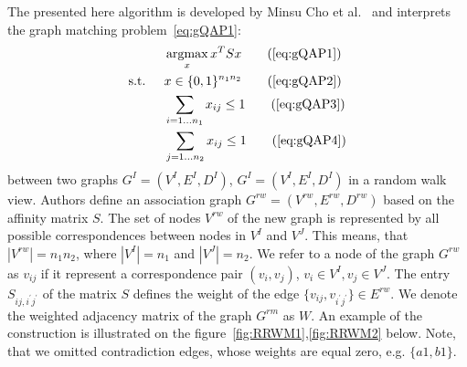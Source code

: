 The presented here algorithm is developed by Minsu Cho et al.~\cite{Cho2010_RRWM} and interprets the graph matching problem~\eqref{eq:gQAP1}:
\begin{alignat*}{2}
&     && \argmax_x{x^TSx}                           \tag{\ref{eq:gQAP1}}\\
& \text{s.t. } &&  x\in \{0,1\}^{n_1n_2}            \tag{\ref{eq:gQAP2}}\\
&             &&  \sum_{i=1\dots n_1} x_{ij}\le 1   \tag{\ref{eq:gQAP3}}\\
&             &&  \sum_{j=1\dots n_2} x_{ij}\le 1   \tag{\ref{eq:gQAP4}}
\end{alignat*}
between two graphs $G^I=(V^I,E^I,D^I)$, $G^I=(V^I,E^I,D^I)$ in a random walk view. Authors define an association graph $G^{rw}=(V^{rw},E^{rw},D^{rw})$ based on the affinity matrix $S$. The set of nodes $V^{rw}$ of the new graph is represented by all possible correspondences between nodes in $V^I$ and $V^J$. This means, that $|V^{rw}|=n_1n_2$, where $|V^I|=n_1$ and $|V^J|=n_2$. We refer to a node of the graph $G^{rw}$ as $v_{ij}$ if it represent a correspondence pair $(v_i,v_j)$, $v_i\in V^I,v_j\in V^J$. The entry $S_{ij,i^\prime j^\prime}$ of the matrix $S$ defines the weight of the edge $\{v_{ij},v_{i^\prime j^\prime}\}\in E^{rw}$. We denote the weighted adjacency matrix of the graph $G^{rm}$ as $W$. An example of the construction is illustrated on the figure~\ref{fig:RRWM1},\ref{fig:RRWM2} below. Note, that we omitted contradiction edges, whose weights are equal zero, e.g. $\{a1,b1\}$.


